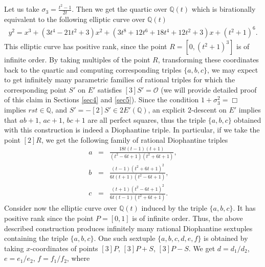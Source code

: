 \documentclass[11pt]{amsart}
\theoremstyle{plain}
\theoremstyle{remark}
\begin{document}
Let us take $\sigma_3=\frac{t^2-1}{2t}$. Then we get the quartic over
$\mathbb{Q}(t)$ which is birationally equivalent to the following elliptic curve over $\mathbb{Q}(t)$
\begin{eqnarray}
\label{ec:1}
y^2=x^3+(3t^4-21t^2+3)x^2+(3t^8+12t^6+18t^4+12t^2+3)x+(t^2+1)^6.
\end{eqnarray}
This elliptic curve has positive rank, since the point $R=[0,(t^2+1)^3]$ is of infinite order. By taking multiples of the point $R$, transforming these coordinates back to the quartic and computing corresponding triples $\{a,b,c\}$, we may expect to get infinitely many
parametric families of rational triples for which the corresponding point $S'$ on $E'$ satisfies $[3]S'= \mathcal{O}$ (we will provide detailed proof of this claim in Sections \ref{sec4} and \ref{sec5}). Since the condition $1+\sigma_3^2=\Box$ implies $rst \in \mathbb{Q}$, and $S'=-[2]S' \in 2E'(\mathbb{Q})$, an explicit $2$-descent on $E'$ implies that $ab+1$, $ac+1$, $bc+1$ are all perfect squares, thus the triple $\{a,b,c\}$ obtained with this construction is indeed a Diophantine triple. In particular, if we take the point $[2]R$, we get the following family of rational Diophantine triples
\begin{eqnarray*}
a &\!\!=\!\!& \frac{18t(t-1)(t+1)}{(t^2-6t+1)(t^2+6t+1)}, \\
b &\!\!=\!\!& \frac{(t-1)(t^2+6t+1)^2}{6t(t+1)(t^2-6t+1)}, \\
c &\!\!=\!\!& \frac{(t+1)(t^2-6t+1)^2}{6t(t-1)(t^2+6t+1)}.
\end{eqnarray*}
Consider now the elliptic curve over $\mathbb{Q}(t)$ induced by the triple $\{a,b,c\}$. It has positive rank since the point $P=[0,1]$ is of infinite order. Thus, the above described construction produces infinitely many rational Diophantine sextuples containing the triple $\{a,b,c\}$. One such sextuple $\{a,b,c,d,e,f\}$ is obtained by taking $x$-coordinates of points $[3]P$, $[3]P+S$, $[3]P-S$. We get $d=d_1/d_2$, $e=e_1/e_2$, $f=f_1/f_2$, where
\end{document}
